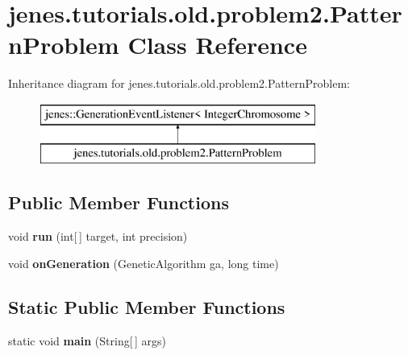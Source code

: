 \hypertarget{classjenes_1_1tutorials_1_1old_1_1problem2_1_1_pattern_problem}{\section{jenes.\-tutorials.\-old.\-problem2.\-Pattern\-Problem Class Reference}
\label{classjenes_1_1tutorials_1_1old_1_1problem2_1_1_pattern_problem}
}
Inheritance diagram for jenes.\-tutorials.\-old.\-problem2.\-Pattern\-Problem\-:\begin{figure}[H]
\begin{center}
\leavevmode
\includegraphics[height=2.000000cm]{classjenes_1_1tutorials_1_1old_1_1problem2_1_1_pattern_problem}
\end{center}
\end{figure}
\subsection*{Public Member Functions}
\begin{DoxyCompactItemize}
\item 
\hypertarget{classjenes_1_1tutorials_1_1old_1_1problem2_1_1_pattern_problem_aaeaef4b515a3fe02044c668a69f038a7}{void {\bfseries run} (int\mbox{[}$\,$\mbox{]} target, int precision)}\label{classjenes_1_1tutorials_1_1old_1_1problem2_1_1_pattern_problem_aaeaef4b515a3fe02044c668a69f038a7}

\item 
\hypertarget{classjenes_1_1tutorials_1_1old_1_1problem2_1_1_pattern_problem_a1ed3cc6f1e19c0ffa6459e9c50aa9079}{void {\bfseries on\-Generation} (Genetic\-Algorithm ga, long time)}\label{classjenes_1_1tutorials_1_1old_1_1problem2_1_1_pattern_problem_a1ed3cc6f1e19c0ffa6459e9c50aa9079}

\end{DoxyCompactItemize}
\subsection*{Static Public Member Functions}
\begin{DoxyCompactItemize}
\item 
\hypertarget{classjenes_1_1tutorials_1_1old_1_1problem2_1_1_pattern_problem_aab48fbec2976973bac23f7d26569453f}{static void {\bfseries main} (String\mbox{[}$\,$\mbox{]} args)}\label{classjenes_1_1tutorials_1_1old_1_1problem2_1_1_pattern_problem_aab48fbec2976973bac23f7d26569453f}

\end{DoxyCompactItemize}


